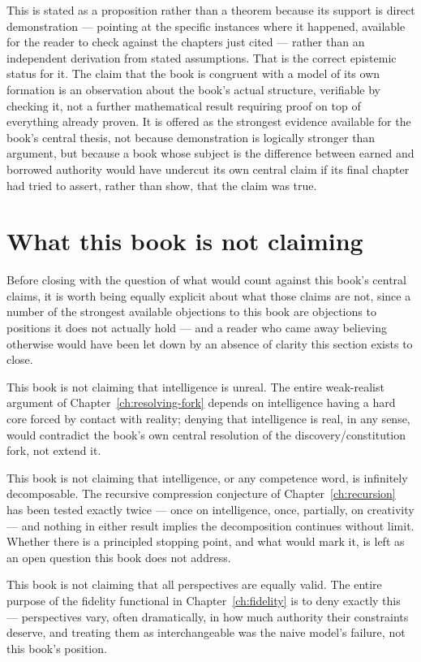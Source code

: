 This is stated as a proposition rather than a theorem because its support is direct demonstration --- pointing at the specific instances where it happened, available for the reader to check against the chapters just cited --- rather than an independent derivation from stated assumptions. That is the correct epistemic status for it. The claim that the book is congruent with a model of its own formation is an observation about the book's actual structure, verifiable by checking it, not a further mathematical result requiring proof on top of everything already proven. It is offered as the strongest evidence available for the book's central thesis, not because demonstration is logically stronger than argument, but because a book whose subject is the difference between earned and borrowed authority would have undercut its own central claim if its final chapter had tried to assert, rather than show, that the claim was true.

\section{What this book is not claiming}

Before closing with the question of what would count against this book's central claims, it is worth being equally explicit about what those claims are not, since a number of the strongest available objections to this book are objections to positions it does not actually hold --- and a reader who came away believing otherwise would have been let down by an absence of clarity this section exists to close.

This book is not claiming that intelligence is unreal. The entire weak-realist argument of Chapter~\ref{ch:resolving-fork} depends on intelligence having a hard core forced by contact with reality; denying that intelligence is real, in any sense, would contradict the book's own central resolution of the discovery/constitution fork, not extend it.

This book is not claiming that intelligence, or any competence word, is infinitely decomposable. The recursive compression conjecture of Chapter~\ref{ch:recursion} has been tested exactly twice --- once on intelligence, once, partially, on creativity --- and nothing in either result implies the decomposition continues without limit. Whether there is a principled stopping point, and what would mark it, is left as an open question this book does not address.

This book is not claiming that all perspectives are equally valid. The entire purpose of the fidelity functional in Chapter~\ref{ch:fidelity} is to deny exactly this --- perspectives vary, often dramatically, in how much authority their constraints deserve, and treating them as interchangeable was the naive model's failure, not this book's position.


